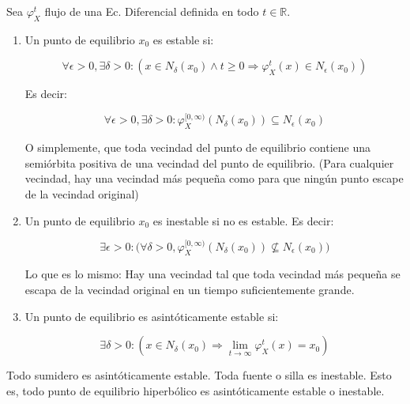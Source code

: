 \begin{defn}
	Sea $\varphi_X^t$ flujo de una Ec. Diferencial definida en todo $t\in \mathbb{R}$. 
	
	\begin{enumerate}
		\item Un punto de equilibrio $x_0$ es estable si:
		
		\begin{equation*}
			\forall \epsilon >0, \exists \delta >0 :( x\in N_{\delta}(x_0) \land t \geq 0  \Rightarrow \varphi^t_X(x) \in N_{\epsilon}(x_0))
		\end{equation*}
		
		Es decir:
		
		\begin{equation*}
			\forall \epsilon >0, \exists \delta >0 :\varphi^{[0,\infty)}_X(N_{\delta}(x_0)) \subseteq N_{\epsilon}(x_0)
		\end{equation*}
		
		O simplemente, que toda vecindad del punto de equilibrio contiene una semiórbita positiva de una vecindad del punto de equilibrio. (Para cualquier vecindad, hay una vecindad más pequeña como para que ningún punto escape de la vecindad original)
		
		\item Un punto de equilibrio $x_0$ es inestable si no es estable. Es decir:
		
		\begin{equation*}
			\exists \epsilon >0:\bigg( \forall \delta >0, \varphi^{[0,\infty)}_X(N_{\delta}(x_0)) \not \subseteq N_{\epsilon}(x_0) \bigg)
		\end{equation*}
		
		Lo que es lo mismo: Hay una vecindad tal que toda vecindad más pequeña se escapa de la vecindad original en un tiempo suficientemente grande. 
		
		\item Un punto de equilibrio es asintóticamente estable si:
		
		\begin{equation*}
			\exists \delta >0 :( x\in N_{\delta}(x_0)  \Rightarrow \lim_{t\to \infty }\varphi^t_X(x) = x_0)
		\end{equation*}
	\end{enumerate}
\end{defn}

\begin{cor}
	Todo sumidero es asintóticamente estable. Toda fuente o silla es inestable. Esto es, todo punto de equilibrio hiperbólico es asintóticamente estable o inestable.
\end{cor}

